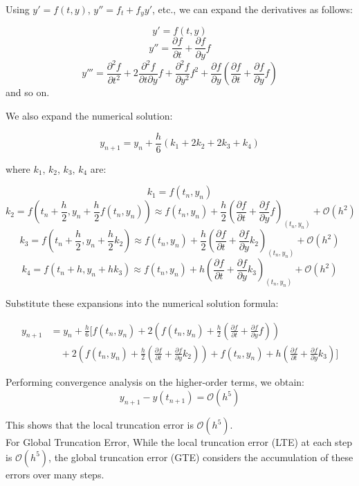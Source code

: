 \documentclass{article}
\begin{document}
Using \( y' = f(t, y) \), \( y'' = f_t + f_y y' \), etc., we can expand the derivatives as follows:

\[
y' = f(t, y)
\]
\[
y'' = \frac{\partial f}{\partial t} + \frac{\partial f}{\partial y} f
\]
\[
y''' = \frac{\partial^2 f}{\partial t^2} + 2 \frac{\partial^2 f}{\partial t \partial y} f + \frac{\partial^2 f}{\partial y^2} f^2 + \frac{\partial f}{\partial y} \left( \frac{\partial f}{\partial t} + \frac{\partial f}{\partial y} f \right)
\]
and so on.

We also expand the numerical solution:

\[
y_{n+1} = y_n + \frac{h}{6}(k_1 + 2k_2 + 2k_3 + k_4)
\]

where \( k_1 \), \( k_2 \), \( k_3 \), \( k_4 \) are:

\[
k_1 = f(t_n, y_n)
\]
\[
k_2 = f\left( t_n + \frac{h}{2}, y_n + \frac{h}{2} f(t_n, y_n) \right) \approx f(t_n, y_n) + \frac{h}{2} \left( \frac{\partial f}{\partial t} + \frac{\partial f}{\partial y} f \right)_{(t_n, y_n)} + \mathcal{O}(h^2)
\]
\[
k_3 = f\left( t_n + \frac{h}{2}, y_n + \frac{h}{2} k_2 \right) \approx f(t_n, y_n) + \frac{h}{2} \left( \frac{\partial f}{\partial t} + \frac{\partial f}{\partial y} k_2 \right)_{(t_n, y_n)} + \mathcal{O}(h^2)
\]
\[
k_4 = f(t_n + h, y_n + h k_3) \approx f(t_n, y_n) + h \left( \frac{\partial f}{\partial t} + \frac{\partial f}{\partial y} k_3 \right)_{(t_n, y_n)} + \mathcal{O}(h^2)
\]

Substitute these expansions into the numerical solution formula:

\begin{align*}
y_{n+1} &= y_n + \frac{h}{6} \bigg[ f(t_n, y_n) + 2\left( f(t_n, y_n) + \frac{h}{2} \left( \frac{\partial f}{\partial t} + \frac{\partial f}{\partial y} f \right) \right) \\
&\quad + 2\left( f(t_n, y_n) + \frac{h}{2} \left( \frac{\partial f}{\partial t} + \frac{\partial f}{\partial y} k_2 \right) \right) + f(t_n, y_n) + h \left( \frac{\partial f}{\partial t} + \frac{\partial f}{\partial y} k_3 \right) \bigg]
\end{align*}

Performing convergence analysis on the higher-order terms, we obtain:
\[
y_{n+1} - y(t_{n+1}) = \mathcal{O}(h^5)
\]

This shows that the local truncation error is \( \mathcal{O}(h^5) \).
\\
For Global Truncation Error,
While the local truncation error (LTE) at each step is \( \mathcal{O}(h^5) \), the global truncation error (GTE) considers the accumulation of these errors over many steps. 
\end{document}
